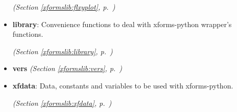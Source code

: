 \begin{itemize}
  \textit{(Section \ref{xformslib:flxyplot}, p.~\pageref{xformslib:flxyplot})}

\item \textbf{library}: 
Convenience functions to deal with xforms-python wrapper's functions.


  \textit{(Section \ref{xformslib:library}, p.~\pageref{xformslib:library})}

\item \textbf{vers}
  \textit{(Section \ref{xformslib:vers}, p.~\pageref{xformslib:vers})}

\item \textbf{xfdata}: 
Data, constants and variables to be used with xforms-python.


  \textit{(Section \ref{xformslib:xfdata}, p.~\pageref{xformslib:xfdata})}

\end{itemize}

